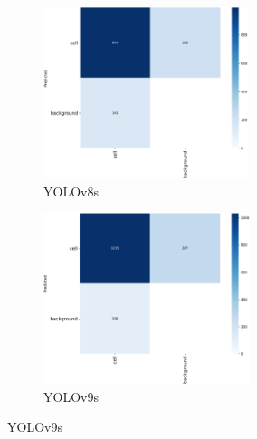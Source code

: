 \documentclass[12pt,a4paper,onecolumn,oneside]{report}
\begin{document}
\begin{figure}[H]
  \centering
  \vspace{-0.3cm}
  \begin{subfigure}[b]{0.45\textwidth}
    \centering
    \includegraphics[height=5cm]{figuras/resultados experimentacion/yolov8s/test3/confusion_matrix.png}
    \vspace{-0.3cm}
    \caption{\footnotesize YOLOv8s}
    \label{fig:confusion_yolov8s_test3}
  \end{subfigure}
  \hfill
  \begin{subfigure}[b]{0.45\textwidth}
    \centering
    \includegraphics[height=5cm]{figuras/resultados experimentacion/yolov9s/test3/confusion_matrix.png}
    \vspace{-0.3cm}
    \caption{\footnotesize YOLOv9s}
    \label{fig:confusion_yolov9s_test3}
  \end{subfigure}
  

\end{figure}
\end{document}
